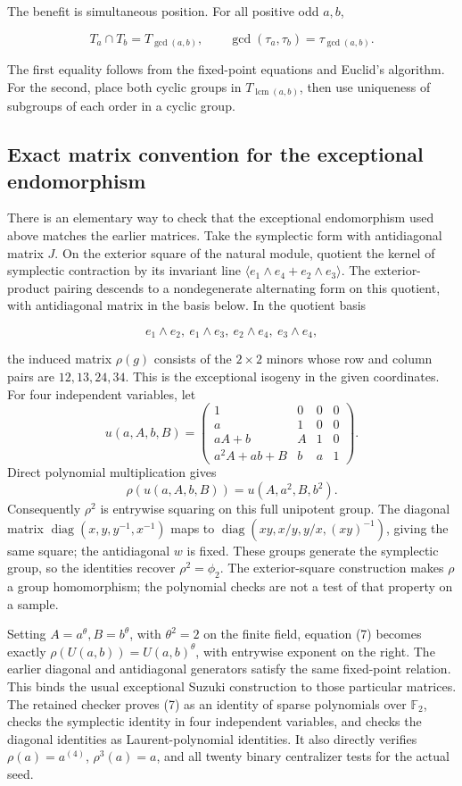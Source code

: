 \documentclass[11pt,a4paper]{article}
\begin{document}
The benefit is simultaneous position. For all positive odd \(a,b\),

\[
T_a\cap T_b=T_{\gcd(a,b)},\qquad
\gcd(\tau_a,\tau_b)=\tau_{\gcd(a,b)}.
\tag{4}
\]

The first equality follows from the fixed-point equations and Euclid's
algorithm. For the second, place both cyclic groups in
\(T_{\operatorname{lcm}(a,b)}\), then use uniqueness of subgroups of
each order in a cyclic group.

\subsection{Exact matrix convention for the exceptional
endomorphism}\label{exact-matrix-convention-for-the-exceptional-endomorphism}

There is an elementary way to check that the exceptional endomorphism
used above matches the earlier matrices. Take the symplectic form with
antidiagonal matrix \(J\). On the exterior square of the natural module,
quotient the kernel of symplectic contraction by its invariant line
\(\langle e_1\wedge e_4+e_2\wedge e_3\rangle\). The exterior-product
pairing descends to a nondegenerate alternating form on this quotient,
with antidiagonal matrix in the basis below. In the quotient basis

\[
e_1\wedge e_2,\ e_1\wedge e_3,\ e_2\wedge e_4,\ e_3\wedge e_4,
\]

the induced matrix \(\rho(g)\) consists of the \(2\times2\) minors whose
row and column pairs are \(12,13,24,34\). This is the exceptional
isogeny in the given coordinates. For four independent variables, let \[
u(a,A,b,B)=
\begin{pmatrix}
1&0&0&0\\a&1&0&0\\aA+b&A&1&0\\
a^2A+ab+B&b&a&1
\end{pmatrix}.
\] Direct polynomial multiplication gives \[
\rho(u(a,A,b,B))=u(A,a^2,B,b^2).
\tag{7}
\] Consequently \(\rho^2\) is entrywise squaring on this full unipotent
group. The diagonal matrix \(\operatorname{diag}(x,y,y^{-1},x^{-1})\)
maps to \(\operatorname{diag}(xy,x/y,y/x,(xy)^{-1})\), giving the same
square; the antidiagonal \(w\) is fixed. These groups generate the
symplectic group, so the identities recover \(\rho^2=\phi_2\). The
exterior-square construction makes \(\rho\) a group homomorphism; the
polynomial checks are not a test of that property on a sample.

Setting \(A=a^\theta,B=b^\theta\), with \(\theta^2=2\) on the finite
field, equation (7) becomes exactly \(\rho(U(a,b))=U(a,b)^\theta\), with
entrywise exponent on the right. The earlier diagonal and antidiagonal
generators satisfy the same fixed-point relation. This binds the usual
exceptional Suzuki construction to those particular matrices. The
retained checker proves (7) as an identity of sparse polynomials over
\(\mathbb F_2\), checks the symplectic identity in four independent
variables, and checks the diagonal identities as Laurent-polynomial
identities. It also directly verifies \(\rho(a)=a^{(4)}\),
\(\rho^3(a)=a\), and all twenty binary centralizer tests for the actual
seed.
\end{document}

